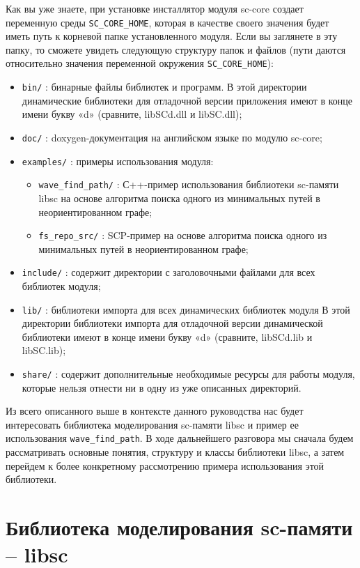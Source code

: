 Как вы уже знаете, при установке инсталлятор модуля sc-core создает
переменную среды \verb+SC_CORE_HOME+, которая в качестве своего значения
будет иметь путь к корневой папке установленного модуля. Если вы
заглянете в эту папку, то сможете увидеть следующую структуру папок и
файлов (пути даются относительно значения переменной окружения
\verb+SC_CORE_HOME+):
\begin{itemize}
\item \verb|bin/| : бинарные файлы библиотек и программ. В этой директории
  динамические библиотеки для отладочной версии приложения имеют в
  конце имени букву «d» (сравните, libSCd.dll и libSC.dll);
\item \verb|doc/| : doxygen-документация на английском языке по модулю sc-core;
\item \verb|examples/| : примеры использования модуля:
  \begin{itemize}
  \item \verb|wave_find_path/| : С++-пример использования библиотеки
    sc-памяти libsc на основе алгоритма поиска одного из минимальных
    путей в неориентированном графе;
  \item \verb|fs_repo_src/| : SCP-пример на основе алгоритма поиска одного из
    минимальных путей в неориентированном графе;
  \end{itemize}
\item \verb|include/| : содержит директории с заголовочными файлами для всех библиотек
  модуля;
\item \verb|lib/| : библиотеки импорта для всех динамических библиотек модуля
  В этой директории библиотеки импорта для отладочной версии
  динамической библиотеки имеют в конце имени букву «d» (сравните,
  libSCd.lib и libSC.lib);
\item \verb|share/| : содержит дополнительные необходимые ресурсы для работы
  модуля, которые нельзя отнести ни в одну из уже описанных
  директорий.
\end{itemize}

Из всего описанного выше в контексте данного руководства нас будет
интересовать библиотека моделирования sc-памяти libsc и пример ее
использования \verb|wave_find_path|. В ходе дальнейшего разговора мы сначала
будем рассматривать основные понятия, структуру и классы библиотеки
libsc, а затем перейдем к более конкретному рассмотрению примера
использования этой библиотеки.

\section{Библиотека моделирования sc-памяти – libsc}

